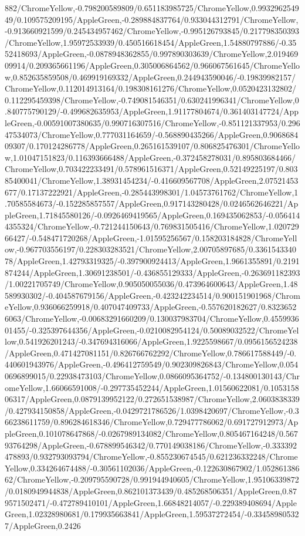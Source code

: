 {\begin{tikzternal}
882/ChromeYellow,-0.798200589809/0.651183985725/ChromeYellow,0.993296254949/0.109575209195/AppleGreen,-0.289884837764/0.933044312791/ChromeYellow,-0.913660921599/0.245434957462/ChromeYellow,-0.995126793845/0.217798350393/ChromeYellow,1.95972533939/0.450516618454/AppleGreen,1.54880797886/-0.3552418693/AppleGreen,-0.0878948362855/0.997890303639/ChromeYellow,2.01946909914/0.209365661196/AppleGreen,0.305006864562/0.966067561645/ChromeYellow,0.852635859508/0.469919169332/AppleGreen,0.244943590046/-0.19839982157/ChromeYellow,0.112014913164/0.198308161276/ChromeYellow,0.0520423132802/0.112295459398/ChromeYellow,-0.749081546351/0.630241996341/ChromeYellow,0.840775790129/-0.499682635953/AppleGreen,1.91177804674/0.361403147724/AppleGreen,-0.00591007380635/0.990716307516/ChromeYellow,-0.851121337953/0.29647534073/ChromeYellow,0.777031164659/-0.568890435266/AppleGreen,0.906868409307/0.170124286778/AppleGreen,0.265161539107/0.806825476301/ChromeYellow,1.01047151823/0.116393666488/AppleGreen,-0.372458278031/0.895803684466/ChromeYellow,0.703422233491/0.578961516371/AppleGreen,0.52149225197/0.80385400041/ChromeYellow,1.38931454234/-0.416609567708/AppleGreen,2.07521453677/0.17137222921/AppleGreen,-0.285443998301/1.04573761762/ChromeYellow,1.70585584673/-0.152285857557/AppleGreen,0.917143280428/0.0246562646221/AppleGreen,1.71845580126/-0.0926469419565/AppleGreen,0.169435062853/-0.0564144355324/ChromeYellow,-0.721244150643/0.769831505416/ChromeYellow,1.02072966427/-0.548471720268/AppleGreen,-1.01595256567/0.158203184828/ChromeYellow,-0.967703556197/0.228303283521/ChromeYellow,2.00705897685/0.336154334078/AppleGreen,1.42793319325/-0.397900924413/AppleGreen,1.9661355891/0.2191874244/AppleGreen,1.30691238501/-0.436855129333/AppleGreen,-0.263691182393/1.00221705749/ChromeYellow,0.905050055036/0.473964600643/AppleGreen,1.48589930302/-0.404587679156/AppleGreen,-0.423242234514/0.900151901968/ChromeYellow,0.936066259918/0.407047409733/AppleGreen,-0.557620182627/0.83236526063/ChromeYellow,-0.00683291660209/0.130037983704/ChromeYellow,0.455993601455/-0.325397644356/AppleGreen,-0.0210082954124/0.50089032522/ChromeYellow,0.541926201243/-0.347694316066/AppleGreen,1.9225598667/0.0956156524238/AppleGreen,0.471427081151/0.826766762292/ChromeYellow,0.786617588449/-0.440601943976/AppleGreen,-0.496412759549/0.902309826843/ChromeYellow,0.0540696899015/0.22938473103/ChromeYellow,0.0866095364752/-0.134800130143/ChromeYellow,1.66066591008/-0.297735452244/AppleGreen,1.01560622081/0.105315806317/AppleGreen,0.0879139952122/0.272651538987/ChromeYellow,2.0603838339/0.427934150858/AppleGreen,-0.0429721786526/1.0398420697/ChromeYellow,-0.366238611759/0.896284618346/ChromeYellow,0.729477786062/0.691727912973/AppleGreen,0.101078647868/-0.0267989134082/ChromeYellow,0.805467164248/0.56793764298/AppleGreen,-0.678899546342/0.770149038186/ChromeYellow,-0.333392478893/0.932793093794/ChromeYellow,-0.855230674545/0.621236332248/ChromeYellow,0.334264674488/-0.30561102036/AppleGreen,-0.122630867902/1.05286138662/ChromeYellow,-0.209795590728/0.991944940605/ChromeYellow,1.95106339872/0.0180949944838/AppleGreen,0.862101373439/0.485268506351/AppleGreen,0.879571502471/-0.472789410101/AppleGreen,1.66848214057/-0.229389408694/AppleGreen,1.02328980681/0.179935663841/AppleGreen,1.59537272454/-0.334589805327/AppleGreen,0.2426
\end{tikzternal}}
